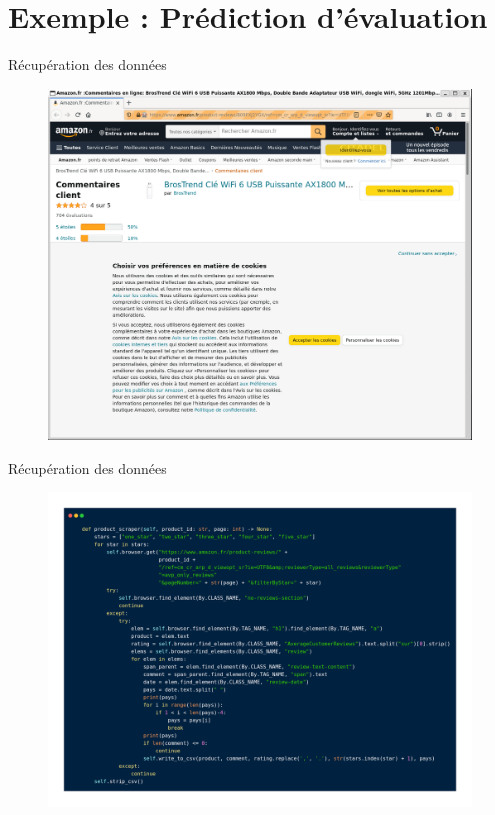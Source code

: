 \section{Exemple : Prédiction d'évaluation}

\begin{frame}{Récupération des données}
\begin{figure}[ht]
\includegraphics[scale=.23]{img/amazon.png}
\end{figure}
\end{frame}

\begin{frame}{Récupération des données}
\begin{figure}[ht]
\includegraphics[scale=.22]{img/scraping_model.png}
\end{figure}
\end{frame}

